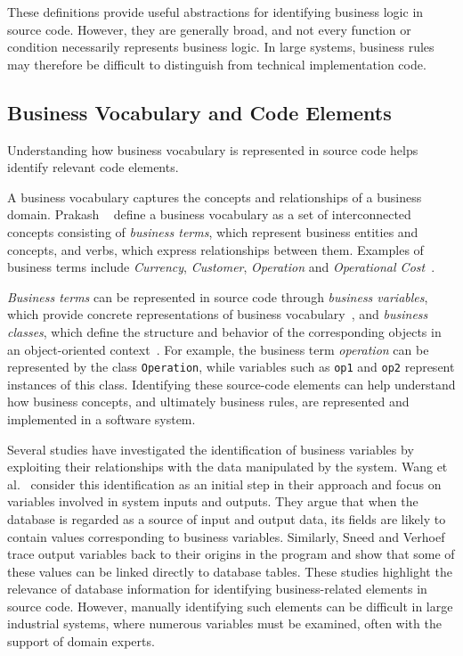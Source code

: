 These definitions provide useful abstractions for identifying business logic in source code. However, they are generally broad, and not every function or condition necessarily represents business logic. In large systems, business rules may therefore be difficult to distinguish from technical implementation code.

\subsection{Business Vocabulary and Code Elements}
\label{sec:businessVar}

Understanding how business vocabulary is represented in source code helps identify relevant code elements.

A business vocabulary captures the concepts and relationships of a business domain. Prakash \etal~\cite{Prak21a} define a business vocabulary as a set of interconnected concepts consisting of \textit{business terms}, which represent business entities and concepts, and verbs, which express relationships between them. Examples of business terms include \textit{Currency}, \textit{Customer}, \textit{Operation} and \textit{Operational Cost}~\cite{Ayac26a}.

\textit{Business terms} can be represented in source code through \textit{business variables}, which provide concrete representations of business vocabulary~\cite{Wang08b}, and \textit{business classes}, which define the structure and behavior of the corresponding objects in an object-oriented context~\cite{Ayac26a}. For example, the business term \textit{operation} can be represented by the class \texttt{Operation}, while variables such as \texttt{op1} and \texttt{op2} represent instances of this class. Identifying these source-code elements can help understand how business concepts, and ultimately business rules, are represented and implemented in a software system.

Several studies have investigated the identification of business variables by exploiting their relationships with the data manipulated by the system. Wang et al.~\cite{Wang08b} consider this identification as an initial step in their approach and focus on variables involved in system inputs and outputs. They argue that when the database is regarded as a source of input and output data, its fields are likely to contain values corresponding to business variables. Similarly, Sneed and Verhoef~\cite{Snee21a} trace output variables back to their origins in the program and show that some of these values can be linked directly to database tables. These studies highlight the relevance of database information for identifying business-related elements in source code. However, manually identifying such elements can be difficult in large industrial systems, where numerous variables must be examined, often with the support of domain experts.

